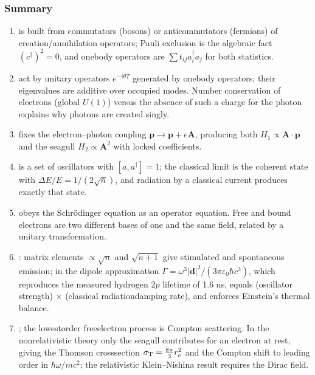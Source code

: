 \documentclass[letterpaper,10pt,english]{jupyterBook}
\begin{document}
\subsubsection*{Summary}
\begin{enumerate}
%
\item {} 
\sphinxAtStartPar
{} is built from commutators (bosons) or anticommutators (fermions) of creation/annihilation operators; Pauli exclusion is the algebraic fact \((c^\dagger)^2=0\), and one\sphinxhyphen{}body operators are \(\sum t_{ij}a_i^\dagger a_j\) for both statistics.

\item {} 
\sphinxAtStartPar
{} act by unitary operators \(e^{-i\theta T}\) generated by one\sphinxhyphen{}body operators; their eigenvalues are additive over occupied modes. Number conservation of electrons (global \(U(1)\)) versus the absence of such a charge for the photon explains why photons are created singly.

\item {} 
\sphinxAtStartPar
{} fixes the electron–photon coupling \(\mathbf p\to\mathbf p+e\mathbf A\), producing both \(H_1\propto\mathbf A\!\cdot\!\mathbf p\) and the seagull \(H_2\propto\mathbf A^2\) with locked coefficients.

\item {} 
\sphinxAtStartPar
{} is a set of oscillators with \([a,a^\dagger]=1\); the classical limit is the coherent state with \(\Delta E/E=1/(2\sqrt{\bar n})\), and radiation by a classical current produces exactly that state.

\item {} 
\sphinxAtStartPar
{} obeys the Schrödinger equation as an operator equation. Free and bound electrons are two different bases of one and the same field, related by a unitary transformation.

\item {} 
\sphinxAtStartPar
{}: matrix elements \(\propto\sqrt{n}\) and \(\sqrt{n+1}\) give stimulated and spontaneous emission; in the dipole approximation \(\Gamma=\omega^3|\mathbf d|^2/(3\pi\varepsilon_0\hbar c^3)\), which reproduces the measured hydrogen \(2p\) lifetime of 1.6 ns, equals (oscillator strength) × (classical radiation\sphinxhyphen{}damping rate), and enforces Einstein’s thermal balance.

\item {} 
\sphinxAtStartPar
{}; the lowest\sphinxhyphen{}order free\sphinxhyphen{}electron process is Compton scattering. In the non\sphinxhyphen{}relativistic theory only the seagull contributes for an electron at rest, giving the Thomson cross\sphinxhyphen{}section \(\sigma_{\rm T}=\tfrac{8\pi}{3}r_e^2\) and the Compton shift to leading order in \(\hbar\omega/mc^2\); the relativistic Klein–Nishina result requires the Dirac field.

\end{enumerate}
\end{document}
